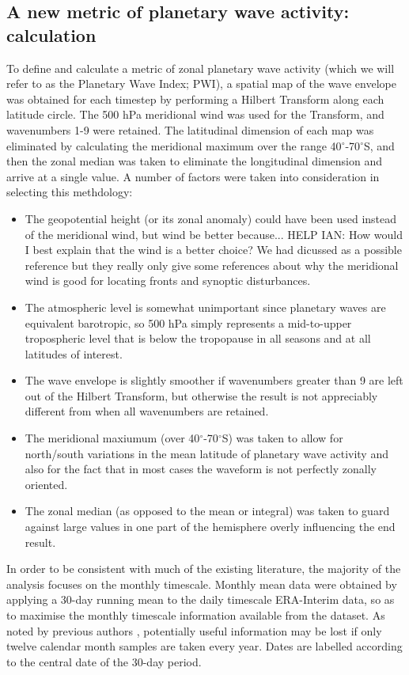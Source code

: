 \subsection{A new metric of planetary wave activity: calculation}

To define and calculate a metric of zonal planetary wave activity (which we will refer to as the Planetary Wave Index; PWI), a spatial map of the wave envelope was obtained for each timestep by performing a Hilbert Transform along each latitude circle. The 500 hPa meridional wind was used for the Transform, and wavenumbers 1-9 were retained. The latitudinal dimension of each map was eliminated by calculating the meridional maximum over the range 40$^{\circ}$-70$^{\circ}$S, and then the zonal median was taken to eliminate the longitudinal dimension and arrive at a single value. A number of factors were taken into consideration in selecting this methdology:
\begin{itemize}
\item The geopotential height (or its zonal anomaly) could have been used instead of the meridional wind, but wind be better because... HELP IAN: How would I best explain that the wind is a better choice? We had dicussed \citet{Hope2014} as a possible reference but they really only give some references about why the meridional wind is good for locating fronts and synoptic disturbances.
\item The atmospheric level is somewhat unimportant since planetary waves are equivalent barotropic, so 500 hPa simply represents a mid-to-upper tropospheric level that is below the tropopause in all seasons and at all latitudes of interest.
\item The wave envelope is slightly smoother if wavenumbers greater than 9 are left out of the Hilbert Transform, but otherwise the result is not appreciably different from when all wavenumbers are retained.
\item The meridional maxiumum (over 40$^{\circ}$-70$^{\circ}$S) was taken to allow for north/south variations in the mean latitude of planetary wave activity and also for the fact that in most cases the waveform is not perfectly zonally oriented. 
\item The zonal median (as opposed to the mean or integral) was taken to guard against large values in one part of the hemisphere overly influencing the end result.
\end{itemize}

In order to be consistent with much of the existing literature, the majority of the analysis focuses on the monthly timescale. Monthly mean data were obtained by applying a 30-day running mean to the daily timescale ERA-Interim data, so as to maximise the monthly timescale information available from the dataset. As noted by previous authors \citep[e.g.][]{Kidson1988}, potentially useful information may be lost if only twelve calendar month samples are taken every year. Dates are labelled according to the central date of the 30-day period.   